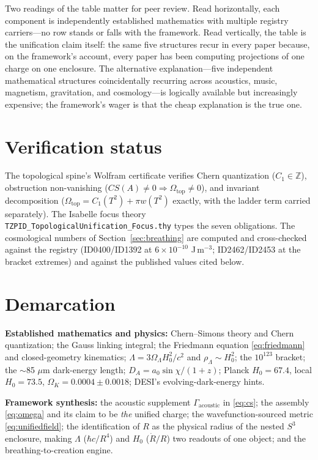 \documentclass[11pt]{article}
\theoremstyle{remark}
\begin{document}
Two readings of the table matter for peer review. Read horizontally, each component is independently established mathematics with multiple registry carriers---no row stands or falls with the framework. Read vertically, the table is the unification claim itself: the same five structures recur in every paper because, on the framework's account, every paper has been computing projections of one charge on one enclosure. The alternative explanation---five independent mathematical structures coincidentally recurring across acoustics, music, magnetism, gravitation, and cosmology---is logically available but increasingly expensive; the framework's wager is that the cheap explanation is the true one.

\section{Verification status}
\label{sec:verification}

The topological spine's Wolfram certificate verifies Chern quantization ($C_1 \in \mathbb{Z}$), obstruction non-vanishing ($CS(A) \neq 0 \Rightarrow \Omega_{\mathrm{top}} \neq 0$), and invariant decomposition ($\Omega_{\mathrm{top}} = C_1(T^2) + \pi w(T^2)$ exactly, with the ladder term carried separately). The Isabelle focus theory \texttt{TZPID\_TopologicalUnification\_Focus.thy} types the seven obligations. The cosmological numbers of Section~\ref{sec:breathing} are computed and cross-checked against the registry (ID0400/ID1392 at $6 \times 10^{-10}$ J\,m$^{-3}$; ID2462/ID2453 at the bracket extremes) and against the published values cited below.

\section{Demarcation}
\label{sec:demarcation}

\textbf{Established mathematics and physics:} Chern--Simons theory and Chern quantization; the Gauss linking integral; the Friedmann equation \eqref{eq:friedmann} and closed-geometry kinematics; $\Lambda = 3\Omega_\Lambda H_0^2/c^2$ and $\rho_\Lambda \sim H_0^2$; the $10^{123}$ bracket; the $\sim$85 $\mu$m dark-energy length; $D_A = a_0 \sin\chi/(1+z)$; Planck $H_0 = 67.4$, local $H_0 = 73.5$, $\Omega_K = 0.0004 \pm 0.0018$; DESI's evolving-dark-energy hints.

\textbf{Framework synthesis:} the acoustic supplement $\Gamma_{\mathrm{acoustic}}$ in \eqref{eq:cs}; the assembly \eqref{eq:omega} and its claim to be \emph{the} unified charge; the wavefunction-sourced metric \eqref{eq:unifiedfield}; the identification of $R$ as the physical radius of the nested $S^3$ enclosure, making $\Lambda$ ($\hbar c/R^4$) and $H_0$ ($\dot{R}/R$) two readouts of one object; and the breathing-to-creation engine.
\end{document}

